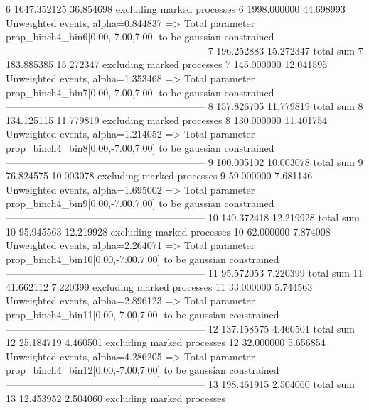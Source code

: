 6          1647.352125     36.854698       excluding marked processes    
6          1998.000000     44.698993       Unweighted events, alpha=0.844837
  => Total parameter prop_binch4_bin6[0.00,-7.00,7.00] to be gaussian constrained
------------------------------------------------------------
7          196.252883      15.272347       total sum                     
7          183.885385      15.272347       excluding marked processes    
7          145.000000      12.041595       Unweighted events, alpha=1.353468
  => Total parameter prop_binch4_bin7[0.00,-7.00,7.00] to be gaussian constrained
------------------------------------------------------------
8          157.826705      11.779819       total sum                     
8          134.125115      11.779819       excluding marked processes    
8          130.000000      11.401754       Unweighted events, alpha=1.214052
  => Total parameter prop_binch4_bin8[0.00,-7.00,7.00] to be gaussian constrained
------------------------------------------------------------
9          100.005102      10.003078       total sum                     
9          76.824575       10.003078       excluding marked processes    
9          59.000000       7.681146        Unweighted events, alpha=1.695002
  => Total parameter prop_binch4_bin9[0.00,-7.00,7.00] to be gaussian constrained
------------------------------------------------------------
10         140.372418      12.219928       total sum                     
10         95.945563       12.219928       excluding marked processes    
10         62.000000       7.874008        Unweighted events, alpha=2.264071
  => Total parameter prop_binch4_bin10[0.00,-7.00,7.00] to be gaussian constrained
------------------------------------------------------------
11         95.572053       7.220399        total sum                     
11         41.662112       7.220399        excluding marked processes    
11         33.000000       5.744563        Unweighted events, alpha=2.896123
  => Total parameter prop_binch4_bin11[0.00,-7.00,7.00] to be gaussian constrained
------------------------------------------------------------
12         137.158575      4.460501        total sum                     
12         25.184719       4.460501        excluding marked processes    
12         32.000000       5.656854        Unweighted events, alpha=4.286205
  => Total parameter prop_binch4_bin12[0.00,-7.00,7.00] to be gaussian constrained
------------------------------------------------------------
13         198.461915      2.504060        total sum                     
13         12.453952       2.504060        excluding marked processes    
